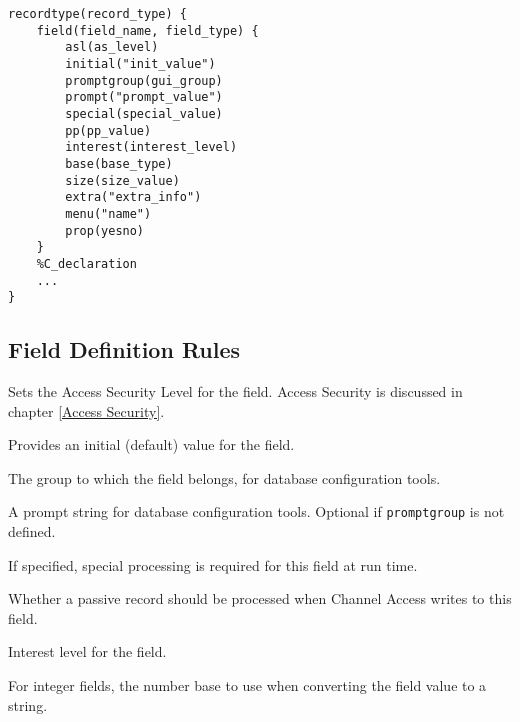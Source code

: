 \begin{verbatim}
recordtype(record_type) {
    field(field_name, field_type) {
        asl(as_level)
        initial("init_value")
        promptgroup(gui_group)
        prompt("prompt_value")
        special(special_value)
        pp(pp_value)
        interest(interest_level)
        base(base_type)
        size(size_value)
        extra("extra_info")
        menu("name")
        prop(yesno)
    }
    %C_declaration
    ...
}
\end{verbatim}

\subsection{Field Definition Rules}

\begin{description}

\item [asl] Sets the Access Security Level for the field.
Access Security is discussed in chapter \ref{Access Security}.

\item [initial] Provides an initial (default) value for the field.

\item [promptgroup] The group to which the field belongs, for database configuration tools.

\item [prompt] A prompt string for database configuration tools.
Optional if \verb|promptgroup| is not defined.

\item [special] If specified, special processing is required for this field at run time.

\item [pp] Whether a passive record should be processed when Channel Access writes to this field.

\item [interest] Interest level for the field.

\item [base] For integer fields, the number base to use when converting the field value to a string.


\end{description}

